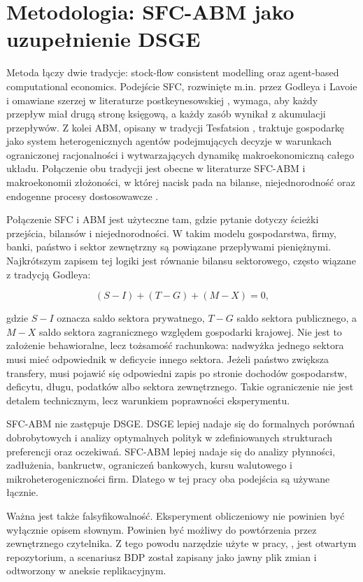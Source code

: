 \section{Metodologia: SFC-ABM jako uzupełnienie DSGE}

Metoda łączy dwie tradycje: stock-flow consistent modelling oraz agent-based computational economics. Podejście SFC, rozwinięte m.in. przez Godleya i Lavoie \parencite{godley2007} i omawiane szerzej w literaturze postkeynesowskiej \parencite{caverzasi2015}, wymaga, aby każdy przepływ miał drugą stronę księgową, a każdy zasób wynikał z akumulacji przepływów. Z kolei ABM, opisany w tradycji Tesfatsion \parencite{tesfatsion2006}, traktuje gospodarkę jako system heterogenicznych agentów podejmujących decyzje w warunkach ograniczonej racjonalności i wytwarzających dynamikę makroekonomiczną całego układu. Połączenie obu tradycji jest obecne w literaturze SFC-ABM i makroekonomii złożoności, w której nacisk pada na bilanse, niejednorodność oraz endogenne procesy dostosowawcze \parencite{caiani2016,dosi2010,delligatti2011,dafermos2017}.

Połączenie SFC i ABM jest użyteczne tam, gdzie pytanie dotyczy ścieżki przejścia, bilansów i niejednorodności. W takim modelu gospodarstwa, firmy, banki, państwo i sektor zewnętrzny są powiązane przepływami pieniężnymi. Najkrótszym zapisem tej logiki jest równanie bilansu sektorowego, często wiązane z tradycją Godleya:

\[
(S - I) + (T - G) + (M - X) = 0,
\]

gdzie \(S - I\) oznacza saldo sektora prywatnego, \(T - G\) saldo sektora publicznego, a \(M - X\) saldo sektora zagranicznego względem gospodarki krajowej. Nie jest to założenie behawioralne, lecz tożsamość rachunkowa: nadwyżka jednego sektora musi mieć odpowiednik w deficycie innego sektora. Jeżeli państwo zwiększa transfery, musi pojawić się odpowiedni zapis po stronie dochodów gospodarstw, deficytu, długu, podatków albo sektora zewnętrznego. Takie ograniczenie nie jest detalem technicznym, lecz warunkiem poprawności eksperymentu.

SFC-ABM nie zastępuje DSGE. DSGE lepiej nadaje się do formalnych porównań dobrobytowych i analizy optymalnych polityk w zdefiniowanych strukturach preferencji oraz oczekiwań. SFC-ABM lepiej nadaje się do analizy płynności, zadłużenia, bankructw, ograniczeń bankowych, kursu walutowego i mikroheterogeniczności firm. Dlatego w tej pracy oba podejścia są używane łącznie.

Ważna jest także falsyfikowalność. Eksperyment obliczeniowy nie powinien być wyłącznie opisem słownym. Powinien być możliwy do powtórzenia przez zewnętrznego czytelnika. Z tego powodu narzędzie użyte w pracy, \amor{}, jest otwartym repozytorium, a scenariusz BDP został zapisany jako jawny plik zmian i odtworzony w aneksie replikacyjnym.
